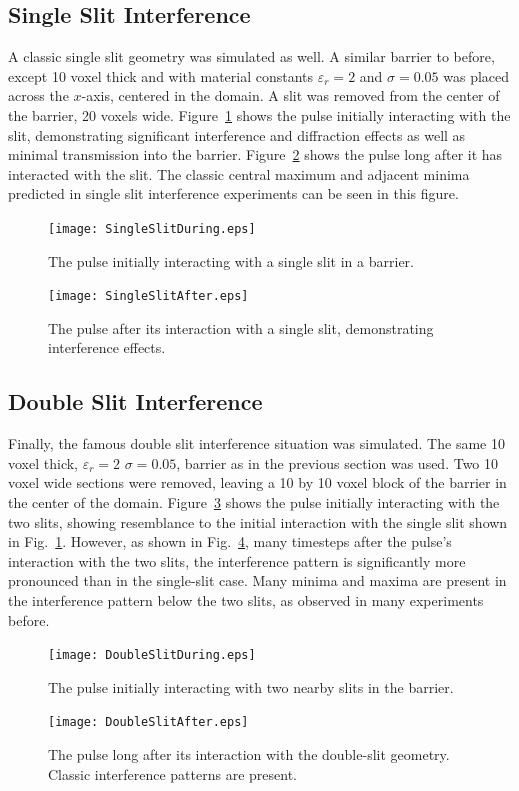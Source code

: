 \documentclass[12pt]{article}
\begin{document}
\begin{multicols}{2}
\subsection{Single Slit Interference}
A classic single slit geometry was simulated as well. A similar barrier to before, except 10 voxel thick and with material constants $\varepsilon_r=2$ and $\sigma=0.05$ was placed across the $x$-axis, centered in the domain. A slit was removed from the center of the barrier, 20 voxels wide. Figure~\ref{fig:SingleSlitDuring} shows the pulse initially interacting with the slit, demonstrating significant interference and diffraction effects as well as minimal transmission into the barrier. Figure~\ref{fig:SingleSlitAfter} shows the pulse long after it has interacted with the slit. The classic central maximum and adjacent minima predicted in single slit interference experiments can be seen in this figure.
\begin{figure}[H]
\centering
\texttt{[image: SingleSlitDuring.eps]}
\caption{The pulse initially interacting with a single slit in a barrier.}
\label{fig:SingleSlitDuring}
\end{figure}
\begin{figure}[H]
\centering
\texttt{[image: SingleSlitAfter.eps]}
\caption{The pulse after its interaction with a single slit, demonstrating interference effects.}
\label{fig:SingleSlitAfter}
\end{figure}
\subsection{Double Slit Interference}
Finally, the famous double slit interference situation was simulated. The same 10 voxel thick, $\varepsilon_r=2$ $\sigma=0.05$, barrier as in the previous section was used. Two 10 voxel wide sections were removed, leaving a 10 by 10 voxel block of the barrier in the center of the domain. Figure~\ref{fig:DoubleSlitDuring} shows the pulse initially interacting with the two slits, showing resemblance to the initial interaction with the single slit shown in Fig.~\ref{fig:SingleSlitDuring}. However, as shown in Fig.~\ref{fig:DoubleSlitAfter}, many timesteps after the pulse's interaction with the two slits, the interference pattern is significantly more pronounced than in the single-slit case. Many minima and maxima are present in the interference pattern below the two slits, as observed in many experiments before.
\begin{figure}[H]
\centering
\texttt{[image: DoubleSlitDuring.eps]}
\caption{The pulse initially interacting with two nearby slits in the barrier.}
\label{fig:DoubleSlitDuring}
\end{figure}
\begin{figure}[H]
\centering
\texttt{[image: DoubleSlitAfter.eps]}
\caption{The pulse long after its interaction with the double-slit geometry. Classic interference patterns are present.}
\label{fig:DoubleSlitAfter}
\end{figure}

\end{multicols}
\end{document}
